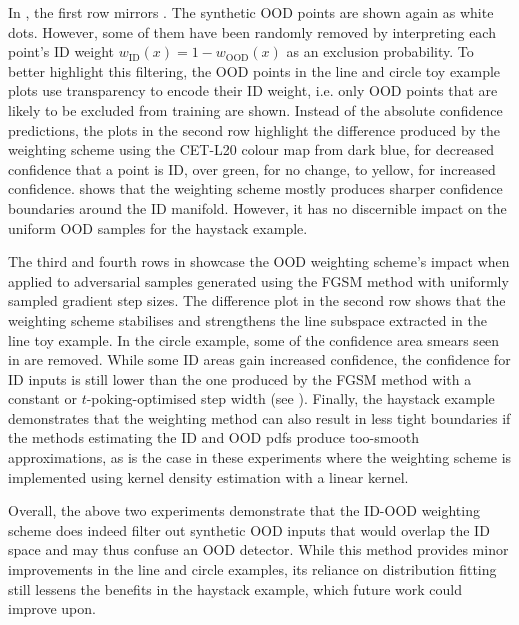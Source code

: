 \noindent In , the first row mirrors . The synthetic OOD points are shown again as white dots. However, some of them have been randomly removed by interpreting each point's ID weight $w_{\text{ID}}(x) = 1 - w_{\text{OOD}}(x)$ as an exclusion probability. To better highlight this filtering, the OOD points in the line and circle toy example plots use transparency to encode their ID weight, i.e. only OOD points that are likely to be excluded from training are shown. Instead of the absolute confidence predictions, the plots in the second row highlight the difference produced by the weighting scheme using the CET-L20 colour map \cite{color-cet-2015, color-cet-2023} from dark blue, for decreased confidence that a point is ID, over green, for no change, to yellow, for increased confidence.  shows that the weighting scheme mostly produces sharper confidence boundaries around the ID manifold. However, it has no discernible impact on the uniform OOD samples for the haystack example.

The third and fourth rows in  showcase the OOD weighting scheme's impact when applied to adversarial samples generated using the FGSM method with uniformly sampled gradient step sizes. The difference plot in the second row shows that the weighting scheme stabilises and strengthens the line subspace extracted in the line toy example. In the circle example, some of the confidence area smears seen in  are removed. While some ID areas gain increased confidence, the confidence for ID inputs is still lower than the one produced by the FGSM method with a constant or $t$-poking-optimised step width (see ). Finally, the haystack example demonstrates that the weighting method can also result in less tight boundaries if the methods estimating the ID and OOD pdfs produce too-smooth approximations, as is the case in these experiments where the weighting scheme is implemented using kernel density estimation with a linear kernel.

\newpar Overall, the above two experiments demonstrate that the ID-OOD weighting scheme does indeed filter out synthetic OOD inputs that would overlap the ID space and may thus confuse an OOD detector. While this method provides minor improvements in the line and circle examples, its reliance on distribution fitting still lessens the benefits in the haystack example, which future work could improve upon.

